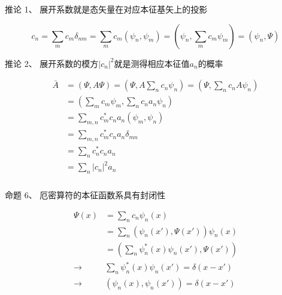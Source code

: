 \begin{frame} 
    \begin{exampleblock}{推论 1、}
        展开系数就是态矢量在对应本征基矢上的投影
    \end{exampleblock}
    \begin{equation*}
        c_n=\sum_m c_m\delta_{nm} = \sum_m c_m(\psi_n, \psi_m)= (\psi_n, \sum_m c_m\psi_m) =(\psi_n, \Psi)
    \end{equation*}
\end{frame} 

\begin{frame} 
    \begin{exampleblock}{推论 2、}
        展开系数的模方$|c_n|^2$就是测得相应本征值$a_n$的概率
    \end{exampleblock}
    \begin{equation*}
        \begin{split}
            \bar{A}&=(\Psi, A\Psi)=(\Psi, A\sum_n c_n \psi_{n})=(\Psi, \sum_n c_n A\psi_{n})\\
            &=(\sum_m c_m \psi_{m}, \sum_n c_n a_n \psi_{n})\\
            &=\sum_{m,n} c_m^* c_n a_n (\psi_m, \psi_n)\\
            &=\sum_{m,n} c_m^* c_n a_n \delta_{mn} \\
            &=\sum_{n} c_n^* c_n a_n  \\
            &=\sum_{n} |c_n|^2 a_n 
        \end{split}
    \end{equation*}
\end{frame} 

\begin{frame} [allowframebreaks=]
    \frametitle{}
    \begin{atcbox}{命题 6、}
        厄密算符的本征函数系具有封闭性
     \end{atcbox}
    \begin{equation*}
        \begin{split}
            \Psi(x)&=\sum_n c_n \psi_{n}(x) \\
            &=\sum_n (\psi_n(x'), \Psi(x')) \psi_{n}(x)\\
            &= (\sum_n\psi_{n} ^* (x)\psi_n(x'), \Psi(x')) \\
            \to &\sum_n\psi_{n} ^* (x)\psi_n(x')=\delta(x-x')\\
            \to &(\psi_{n}(x),\psi_n(x'))=\delta(x-x')
        \end{split} 
    \end{equation*}
\end{frame} 

